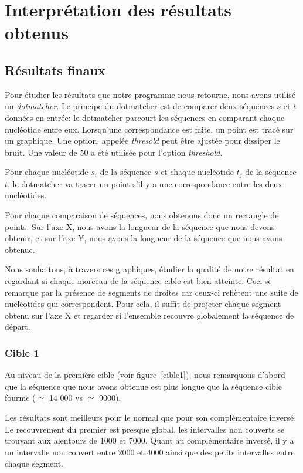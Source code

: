 
\section{Interprétation des résultats obtenus}

\subsection{Résultats finaux}

Pour étudier les résultats que notre programme nous retourne, nous avons utilisé
un \textit{dotmatcher}.
Le principe du dotmatcher est de comparer deux séquences $s$ et $t$ données en
entrée: le dotmatcher parcourt les séquences en comparant chaque nucléotide
entre eux.  Lorsqu'une correspondance est faite, un point est tracé sur un
graphique. Une option, appelée \textit{thresold} peut être ajustée pour dissiper
le bruit. Une valeur de 50 a été utilisée pour l'option \textit{threshold}.

Pour chaque nucléotide $s_{i}$ de la séquence $s$ et chaque nucléotide $t_{j}$
de la séquence $t$, le dotmatcher va tracer un point s'il y a une correspondance
entre les deux nucléotides.

Pour chaque comparaison de séquences, nous obtenons donc un rectangle de
points. Sur l'axe X, nous avons la longueur de la séquence que nous devons
obtenir, et sur l'axe Y, nous avons la longueur de la séquence que nous avons
obtenue.

Nous souhaitons, à travers ces graphiques, étudier la qualité de notre
résultat en regardant si chaque morceau de la séquence cible est bien
atteinte. Ceci se remarque par la présence de segments de droites car ceux-ci
reflètent une suite de nucléotides qui correspondent. Pour cela, il
suffit de projeter chaque segment obtenu sur l'axe X et regarder si l'ensemble
recouvre globalement la séquence de départ.

\subsubsection*{Cible 1}

Au niveau de la première cible (voir figure~\ref{cible1}), nous remarquons d'abord que la séquence que nous
avons obtenue est plus longue que la séquence cible fournie ($\simeq$ 14 000 vs
$\simeq$ 9000).

Les résultats sont meilleurs pour le normal que pour son complémentaire
inversé. Le recouvrement du premier est presque global, les intervalles non
couverts se trouvant aux alentours de 1000 et 7000. Quant au complémentaire
inversé, il y a un intervalle non couvert entre 2000 et 4000 ainsi que des
petits intervalles entre chaque segment.

